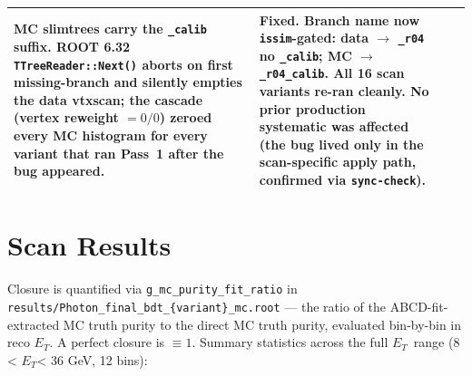 \documentclass[11pt,a4paper]{article}
\newcommand{\etg}{$E_T$}
\begin{document}
\begin{longtable}{@{}p{1.6cm}p{4.3cm}p{6.1cm}p{4.6cm}@{}}
  MC slimtrees carry the \texttt{\_calib} suffix. ROOT 6.32
  \texttt{TTreeReader::Next()} aborts on first missing-branch and
  silently empties the data vtxscan; the cascade
  (vertex reweight $= 0/0$) zeroed every MC histogram for every
  variant that ran Pass~1 after the bug appeared. &
  \textbf{Fixed.} Branch name now \texttt{issim}-gated: data $\to$
  \texttt{\_r04} no \texttt{\_calib}; MC $\to$ \texttt{\_r04\_calib}.
  All 16 scan variants re-ran cleanly. No prior production systematic
  was affected (the bug lived only in the scan-specific apply path,
  confirmed via \texttt{sync-check}). \\
\bottomrule
\end{longtable}

\section{Scan Results}
\label{sec:results}

Closure is quantified via \texttt{g\_mc\_purity\_fit\_ratio} in
\texttt{results/Photon\_final\_bdt\_\{variant\}\_mc.root} --- the
ratio of the ABCD-fit-extracted MC truth purity to the direct MC
truth purity, evaluated bin-by-bin in reco \etg. A perfect closure is
$\equiv 1$. Summary statistics across the full \etg\ range
(8 < \etg < 36 GeV, 12 bins):
\end{document}
